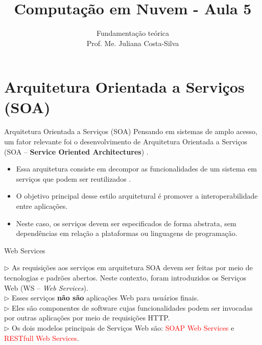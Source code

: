 \documentclass{beamer}
\title{Computação em Nuvem - Aula 5}
\subtitle{Fundamentação teórica\\
Prof. Me. Juliana Costa-Silva}
\begin{document}
\frame{
 \titlepage
}

\section{Arquitetura Orientada a Serviços (SOA)}
\begin{frame}{Arquitetura Orientada a Serviços (SOA)}
Pensando em sistemas de amplo acesso, um fator relevante foi o desenvolvimento de Arquitetura Orientada a Serviços (SOA – \textbf{Service Oriented Architectures}) \cite{de2013cloud}.
\begin{itemize}
    \item Essa arquitetura consiste em decompor as funcionalidades de um sistema em serviços que podem ser reutilizados \cite{bernstein2014containers}.  
    \item O objetivo principal desse estilo arquitetural é promover a interoperabilidade entre aplicações.
    \item Neste caso, os serviços devem ser especificados de forma abstrata, sem dependências em relação a plataformas ou linguagens de programação.
\end{itemize}
\end{frame}
\begin{frame}{Web Services}

    $\rhd$ As requisições aos serviços em arquitetura SOA devem ser feitas por meio de tecnologias e padrões abertos. Neste contexto, foram introduzidos os Serviços Web (WS – \textit{Web Services}).\\
    \vspace{0.5cm}
    $\rhd$ Esses serviços \textbf{não são} aplicações Web para usuários finais. \\
    \vspace{0.5cm}
    $\rhd$ Eles são componentes de software cujas funcionalidades podem ser invocadas por outras aplicações por meio de requisições HTTP. \\
    \vspace{0.5cm}
    $\rhd$ Os dois modelos principais de Serviços Web são: \textcolor{red}{SOAP Web Services} e \textcolor{red}{RESTfull Web Services}.

\end{frame}
\end{document}
